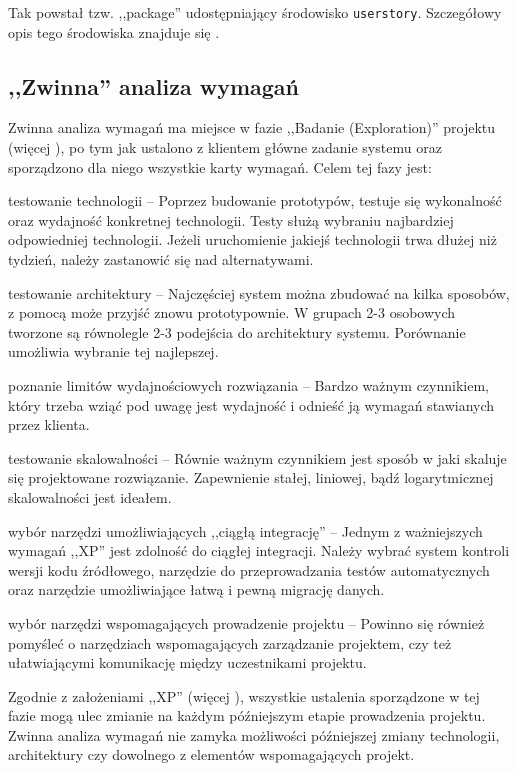 Tak powstał tzw. ,,package'' udostępniający środowisko \texttt{userstory}. Szczegółowy opis tego środowiska znajduje się .

\subsection{,,Zwinna'' analiza wymagań}
\label{sec:ZMTOzwinnaAnalizaWymagan}

Zwinna analiza wymagań ma miejsce w fazie ,,Badanie (Exploration)'' projektu (więcej ), po tym jak ustalono z klientem główne zadanie systemu oraz sporządzono dla niego wszystkie karty wymagań. Celem tej fazy jest:

\begin{packed_item}
    \item testowanie technologii -- Poprzez budowanie prototypów, testuje się wykonalność oraz wydajność konkretnej technologii. Testy służą wybraniu najbardziej odpowiedniej technologii. Jeżeli uruchomienie jakiejś technologii trwa dłużej niż tydzień, należy zastanowić się nad alternatywami.
    \item testowanie architektury -- Najczęściej system można zbudować na kilka sposobów, z pomocą może przyjść znowu prototypownie. W grupach 2-3 osobowych tworzone są równolegle 2-3 podejścia do architektury systemu. Porównanie umożliwia wybranie tej najlepszej.
    \item poznanie limitów wydajnościowych rozwiązania -- Bardzo ważnym czynnikiem, który trzeba wziąć pod uwagę jest wydajność i odnieść ją wymagań stawianych przez klienta.
    \item testowanie skalowalności -- Równie ważnym czynnikiem jest sposób w jaki skaluje się projektowane rozwiązanie. Zapewnienie stałej, liniowej, bądź logarytmicznej skalowalności jest ideałem.
    \item wybór narzędzi umożliwiających ,,ciągłą integrację'' -- Jednym z ważniejszych wymagań ,,XP'' jest zdolność do ciągłej integracji. Należy wybrać system kontroli wersji kodu źródłowego, narzędzie do przeprowadzania testów automatycznych oraz narzędzie umożliwiające łatwą i pewną migrację danych.
    \item wybór narzędzi wspomagających prowadzenie projektu -- Powinno się również pomyśleć o narzędziach wspomagających zarządzanie projektem, czy też ułatwiającymi komunikację między uczestnikami projektu.
\end{packed_item}

Zgodnie z założeniami ,,XP'' (więcej ), wszystkie ustalenia sporządzone w tej fazie mogą ulec zmianie na każdym późniejszym etapie prowadzenia projektu. Zwinna analiza wymagań nie zamyka możliwości późniejszej zmiany technologii, architektury czy dowolnego z elementów wspomagających projekt.

\newpage
